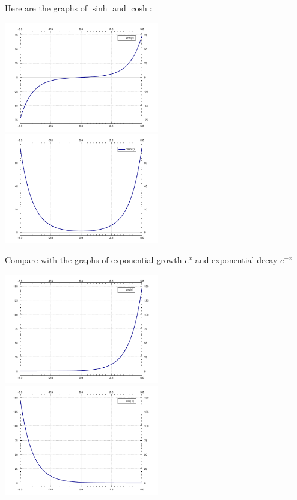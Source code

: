 \documentclass[10pt,aspectratio=169]{beamer}
\begin{document}
\begin{frame}
Here are the graphs of $\sinh$ and $\cosh$:

\begin{center}
\includegraphics[width=2.65in]{figures/sinh.pdf}\quad%
\includegraphics[width=2.65in]{figures/cosh.pdf}
\end{center}

\end{frame}

\begin{frame}
Compare with the graphs of exponential growth $e^x$ and exponential decay
$e^{-x}$

\begin{center}
\includegraphics[width=2.65in]{figures/exp.pdf}\quad%
\includegraphics[width=2.65in]{figures/expdec.pdf}
\end{center}

\end{frame}
\end{document}
